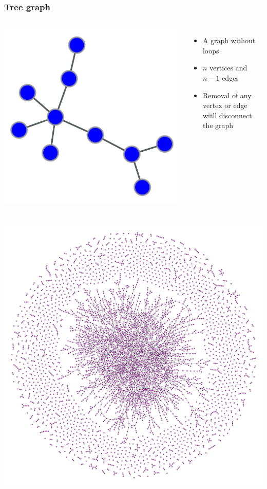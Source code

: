 \documentclass{beamer}
\begin{document}
\begin{frame}
    \frametitle{Tree graph}
    \begin{columns}
    \centering
        \includegraphics[width=0.8\columnwidth]{tree.pdf}
    \centering
    \begin{itemize}
        \setlength\itemsep{1em}
        \item{A graph without loops}
        \item{$n$ vertices and $n-1$ edges}
        \item{Removal of any vertex or edge witll disconnect the graph}
    \end{itemize}
    
    
    \end{columns}
\end{frame}
\begin{frame}
    \frametitle{}
    \centering
        \includegraphics[width=0.8\columnwidth]{er_large.pdf}
\end{frame}
\end{document}

